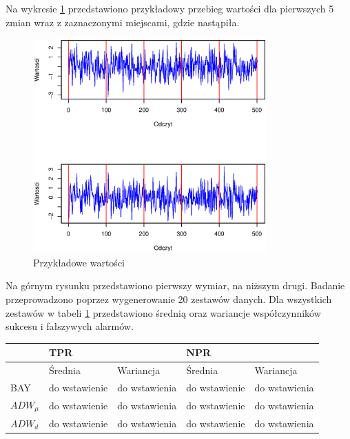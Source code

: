 Na wykresie \ref{fig:CovValues} przedstawiono przykładowy przebieg wartości dla pierwszych 5 zmian
wraz z zaznaczonymi miejscami,
gdzie nastąpiła.
\begin{figure}[htbp]
  \centering
  \includegraphics[width=0.8\textwidth]{img/ch-5-cov}
  \caption{Przykładowe wartości}
  \label{fig:CovValues}
\end{figure}
Na górnym rysunku przedstawiono pierwszy wymiar, na niższym drugi.
Badanie przeprowadzono poprzez wygenerowanie 20 zestawów danych.
Dla wszystkich zestawów w tabeli \ref{tab:JumpingResult} przedstawiono średnią oraz wariancje współczynników sukcesu i fałszywych alarmów.
\begin{table}[h]
  \label{tab:JumpingResult}
  \centering
  \begin{tabular}{l r r r r}
    & \multicolumn{2}{l}{TPR} & \multicolumn{2}{l}{NPR} \\
    \hline
    & \multicolumn{1}{l}{Średnia} & \multicolumn{1}{l}{Wariancja}& \multicolumn{1}{l}{Średnia} & \multicolumn{1}{l}{Wariancja} \\
    \hline
    BAY & do wstawienie & do wstawienia & do wstawienie & do wstawienia \\
    $ADW_{\mu}$ & do wstawienie & do wstawienia & do wstawienie & do wstawienia \\
    $ADW_{d}$ & do wstawienie & do wstawienia & do wstawienie & do wstawienia \\
  \end{tabular}
\end{table}
